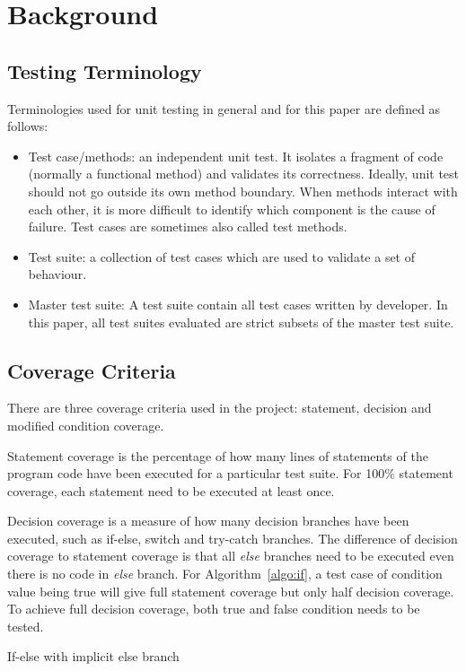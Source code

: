 \section{Background}
\subsection{Testing Terminology}
Terminologies used for unit testing in general and for this paper are defined as follows:
\begin{itemize}
	\item Test case/methods: an independent unit test. It isolates a fragment of code (normally a functional method) and validates its correctness. Ideally, unit test should not go outside its own method boundary. When methods interact with each other, it is more difficult to identify which component is the cause of failure. Test cases are sometimes also called test methods.
	\item Test suite: a collection of test cases which are used to validate a set of behaviour.
	\item Master test suite: A test suite contain all test cases written by developer. In this paper, all test suites evaluated are strict subsets of the master test suite.
\end{itemize}

\subsection{Coverage Criteria}
There are three coverage criteria used in the project: statement, decision and modified condition coverage.

Statement coverage is the percentage of how many lines of statements of the program code have been executed for a particular test suite. For 100\% statement coverage, each statement need to be executed at least once.

Decision coverage is a measure of how many decision branches have been executed, such as if-else, switch and try-catch branches. The difference of decision coverage to statement coverage is that all \textit{else} branches need to be executed even there is no code in \textit{else} branch. For Algorithm~\ref{algo:if}, a test case of condition value being true will give full statement coverage but only half decision coverage. To achieve full decision coverage, both true and false condition needs to be tested.

\begin{algorithm}[t]
	{
	}
	\caption{If-else with implicit else branch}
	\label{algo:if}
	\bigskip
\end{algorithm}

